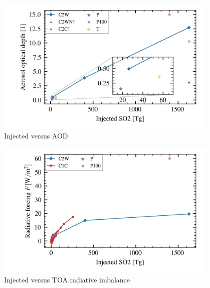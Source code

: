 \documentclass{ametsocV5}
\begin{document}
\begin{figure}
	\begin{center}
		\includegraphics[width=0.95\textwidth]{figures/injection_vs_aod.png}
	\end{center}
	\caption{Injected  versus AOD}
	\label{fig:so2_vs_aod}
\end{figure}

\begin{figure}
	\begin{center}
		\includegraphics[width=0.95\textwidth]{figures/injection_vs_toa.png}
	\end{center}
	\caption{Injected  versus TOA radiative imbalance}
	\label{fig:so2_vs_toa}
\end{figure}
\end{document}
